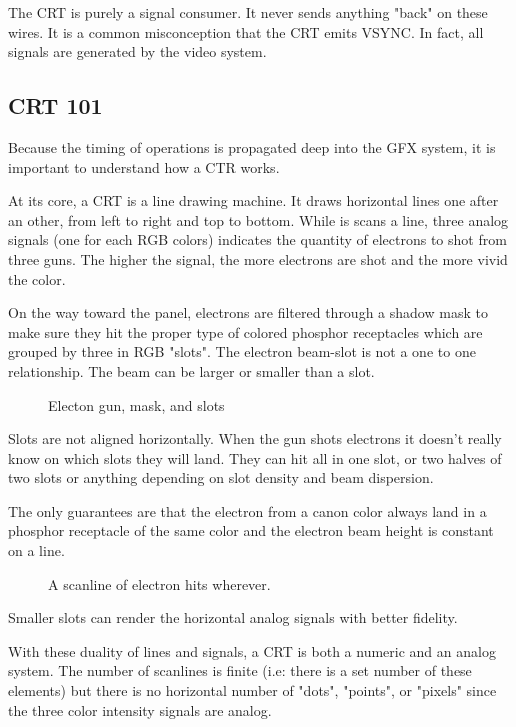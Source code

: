 \begin{trivia} The CRT is purely a signal consumer. It never sends anything "back" on these wires. It is a common misconception that the CRT emits VSYNC. In fact, all signals are generated by the video system.
\end{trivia}


\subsection{CRT 101}

Because the timing of operations is propagated deep into the GFX system, it is important to understand how a CTR works.

At its core, a CRT is a line drawing machine. It draws horizontal lines one after an other, from left to right and top to bottom. While is scans a line, three analog signals (one for each RGB colors) indicates the quantity of electrons to shot from three guns. The higher the signal, the more electrons are shot and the more vivid the color.


On the way toward the panel, electrons are filtered through a shadow mask to make sure they hit the proper type of colored phosphor receptacles which are grouped by three in RGB "slots". The electron beam-slot is not a one to one relationship. The beam can be larger or smaller than a slot.


\begin{figure}[H]
\caption*{Electon gun, mask, and slots}
\end{figure}

Slots are not aligned horizontally. When the gun shots electrons it doesn't really know on which slots they will land. They can hit all in one slot, or two halves of two slots or anything depending on slot density and beam dispersion. 

The only guarantees are that the electron from a canon color always land in a phosphor receptacle of the same color and the electron beam height is constant on a line.

\begin{figure}[H]
\caption*{A scanline of electron hits wherever.}
\end{figure}

Smaller slots can render the horizontal analog signals with better fidelity.





 With these duality of lines and signals, a CRT is both a numeric and an analog system. The number of scanlines is finite (i.e: there is a set number of these elements) but there is no horizontal number of "dots", "points", or "pixels" since the three color intensity signals are analog.


